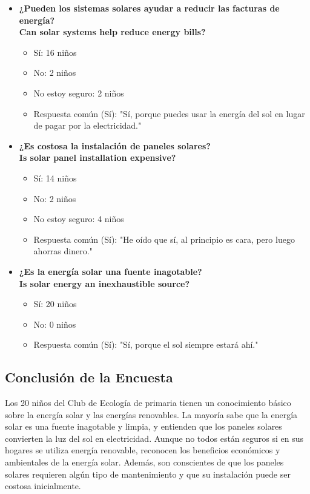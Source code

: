 \documentclass[12pt]{article}
\begin{document}
\begin{itemize}
      \item \textbf{¿Pueden los sistemas solares ayudar a reducir las facturas de energía?}
            \\
            \textbf{Can solar systems help reduce energy bills?}
            \begin{itemize}
                  \item Sí: 16 niños
                  \item No: 2 niños
                  \item No estoy seguro: 2 niños
                  \item Respuesta común (Sí): "Sí, porque puedes usar la energía del sol en lugar de pagar por la electricidad."
            \end{itemize}

      \item \textbf{¿Es costosa la instalación de paneles solares?}
            \\
            \textbf{Is solar panel installation expensive?}
            \begin{itemize}
                  \item Sí: 14 niños
                  \item No: 2 niños
                  \item No estoy seguro: 4 niños
                  \item Respuesta común (Sí): "He oído que sí, al principio es cara, pero luego ahorras dinero."
            \end{itemize}

      \item \textbf{¿Es la energía solar una fuente inagotable?}
            \\
            \textbf{Is solar energy an inexhaustible source?}
            \begin{itemize}
                  \item Sí: 20 niños
                  \item No: 0 niños
                  \item Respuesta común (Sí): "Sí, porque el sol siempre estará ahí."
            \end{itemize}
\end{itemize}

\subsection{Conclusión de la Encuesta}
Los 20 niños del Club de Ecología de primaria tienen un conocimiento básico sobre la energía solar y las energías renovables. La mayoría sabe que la energía solar es una fuente inagotable y limpia, y entienden que los paneles solares convierten la luz del sol en electricidad. Aunque no todos están seguros si en sus hogares se utiliza energía renovable, reconocen los beneficios económicos y ambientales de la energía solar. Además, son conscientes de que los paneles solares requieren algún tipo de mantenimiento y que su instalación puede ser costosa inicialmente.
\end{document}

